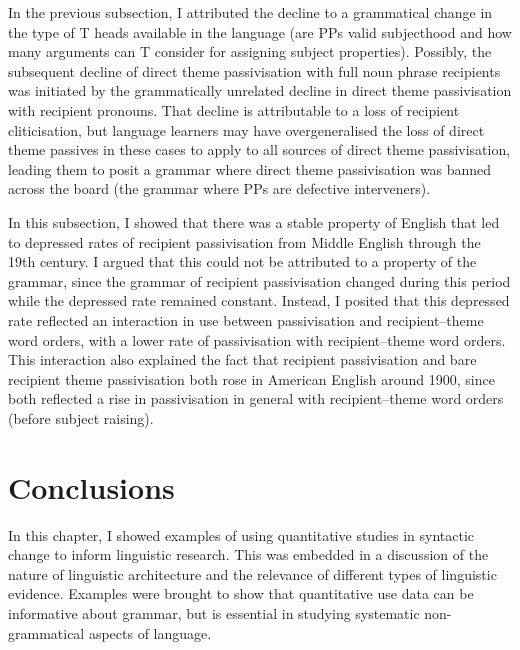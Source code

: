 	In the previous subsection, I attributed the decline to a grammatical change in the type of T heads available in the language (are PPs valid subjecthood and how many arguments can T consider for assigning subject properties). Possibly, the subsequent decline of direct theme passivisation with full noun phrase recipients was initiated by the grammatically unrelated decline in direct theme passivisation with recipient pronouns. That decline is attributable to a loss of recipient cliticisation, but language learners may have overgeneralised the loss of direct theme passives in these cases to apply to all sources of direct theme passivisation, leading them to posit a grammar where direct theme passivisation was banned across the board (the grammar where PPs are defective interveners).

	In this subsection, I showed that there was a stable property of English that led to depressed rates of recipient passivisation from Middle English through the 19th century. I argued that this could not be attributed to a property of the grammar, since the grammar of recipient passivisation changed during this period while the depressed rate remained constant. Instead, I posited that this depressed rate reflected an interaction in use between passivisation and recipient--theme word orders, with a lower rate of passivisation with recipient--theme word orders. This interaction also explained the fact that recipient passivisation and bare recipient theme passivisation both rose in American English around 1900, since both reflected a rise in passivisation in general with recipient--theme word orders (before subject raising).
\section{Conclusions}
	In this chapter, I showed examples of using quantitative studies in syntactic change to inform linguistic research. This was embedded in a discussion of the nature of linguistic architecture and the relevance of different types of linguistic evidence. Examples were brought to show that quantitative use data can be informative about grammar, but is essential in studying systematic non-grammatical aspects of language.
	
